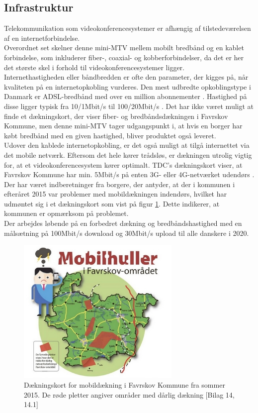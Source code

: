 \subsection{Infrastruktur}
Telekommunikation som videokonferencesystemer er afhængig af tilstedeværelsen af en  internetforbindelse.\\
Overordnet set skelner denne mini-MTV mellem mobilt bredbånd og en kablet forbindelse, som inkluderer fiber-, coaxial- og kobberforbindelser, da det er her det største skel i forhold til videokonferencesystemer ligger.\\
Internethastigheden eller båndbredden er ofte den parameter, der kigges på, når kvaliteten på en internetopkobling vurderes. Den mest udbredte opkoblingstype i Danmark er ADSL-bredbånd med over en million abonnementer \cite{statadsl}. Hastighed på disse ligger typisk fra 10/1Mbit/s til 100/20Mbit/s \cite{tdchastigheder} \cite{telenorhastigheder}. Det har ikke været muligt at finde et dækningskort, der viser fiber- og bredbåndsdækningen i Favrskov Kommune, men denne mini-MTV tager udgangspunkt i, at hvis en borger har købt bredbånd med en given hastighed, bliver produktet også leveret.\\
Udover den kablede internetopkobling, er det også muligt at tilgå internettet via det mobile netværk. Eftersom det hele kører trådsløs, er dækningen utrolig vigtig for, at et videokonferencesystem kører optimalt. TDC's dækningskort viser, at Favrskov Kommune har min. 5Mbit/s på enten 3G- eller 4G-netværket udendørs \cite{tdcdaekning}.
Der har været indberetninger fra borgere, der antyder, at der i kommunen i efteråret 2015 var problemer med mobildækningen indendørs\cite{tv2oj_daekning}, hvilket har udmøntet sig i et dækningskort som vist på figur \ref{fig:dkort}. Dette indikerer, at kommunen er opmærksom på problemet.\\
Der arbejdes løbende på en forbedret dækning og bredbåndshastighed med en målsætning på 100Mbit/s download og 30Mbit/s upload til alle danskere i 2020\cite{digitalvel}.
\begin{figure}[H]
\centering
\includegraphics[width=0.7\textwidth]{Figurer/daekningskort.png}
\caption{\label{fig:dkort}Dækningskort for mobildækning i Favrskov Kommune fra sommer 2015. De røde pletter angiver områder med dårlig dækning [Bilag 14, 14.1]}
\end{figure}

